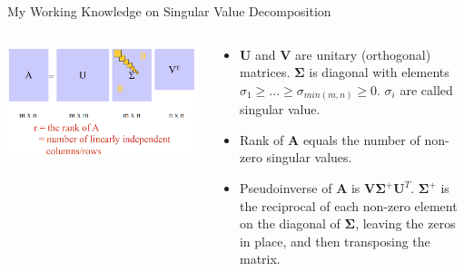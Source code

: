 \documentclass[aspectratio=169]{beamer}
\begin{document}
\begin{frame}{My Working Knowledge on Singular Value Decomposition}
  \begin{columns}
    \begin{column}{.5\textwidth}
      \includegraphics[width=\textwidth]{figures/svd.png}
    \end{column}
    \begin{column}{.5\textwidth}
      \begin{itemize}
        \item $\mathbf{U}$ and $\mathbf{V}$ are unitary (orthogonal) matrices. $\boldsymbol{\Sigma}$ is diagonal with elements $\sigma_1\ge ... \ge\sigma_{min(m,n)}\ge 0$. $\sigma_i$ are called singular value.
        \item Rank of $\mathbf{A}$ equals the number of non-zero singular values.
        \item Pseudoinverse of $\mathbf{A}$ is $\mathbf{V}\boldsymbol{\Sigma}^+\mathbf{U}^T$. $\boldsymbol{\Sigma}^+$ is the reciprocal of each non-zero element on the diagonal of $\boldsymbol{\Sigma}$, leaving the zeros in place, and then transposing the matrix.
      \end{itemize}
    \end{column}
  \end{columns}
\end{frame}
\end{document}
